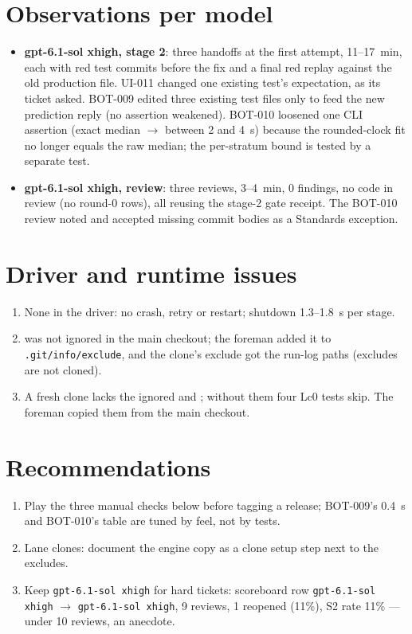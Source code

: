 \documentclass[11pt,a4paper]{article}
\begin{document}
\section*{Observations per model}

\begin{itemize}
  \item \textbf{gpt-6.1-sol xhigh, stage 2}: three handoffs at the first attempt, 11--17~min,
        each with red test commits before the fix and a final red replay against the old
        production file. UI-011 changed one existing test's expectation, as its ticket asked.
        BOT-009 edited three existing test files only to feed the new prediction reply (no
        assertion weakened). BOT-010 loosened one CLI assertion (exact median $\to$ between 2
        and 4~s) because the rounded-clock fit no longer equals the raw median; the per-stratum
        bound is tested by a separate test.
  \item \textbf{gpt-6.1-sol xhigh, review}: three reviews, 3--4~min, 0 findings, no code in
        review (no round-0 rows), all reusing the stage-2 gate receipt. The BOT-010 review noted
        and accepted missing commit bodies as a Standards exception.
\end{itemize}

\section*{Driver and runtime issues}

\begin{enumerate}
  \item None in the driver: no crash, retry or restart; shutdown 1.3--1.8~s per stage.
  \item {} was not ignored in the main checkout; the foreman added it to
        \texttt{.git/info/exclude}, and the clone's exclude got the run-log paths (excludes are
        not cloned).
  \item A fresh clone lacks the ignored  and ; without
        them four Lc0 tests skip. The foreman copied them from the main checkout.
\end{enumerate}

\section*{Recommendations}

\begin{enumerate}
  \item Play the three manual checks below before tagging a release; BOT-009's 0.4~s and
        BOT-010's table are tuned by feel, not by tests.
  \item Lane clones: document the engine copy as a clone setup step next to the excludes.
  \item Keep \texttt{gpt-6.1-sol xhigh} for hard tickets: scoreboard row
        \texttt{gpt-6.1-sol xhigh} $\rightarrow$ \texttt{gpt-6.1-sol xhigh}, 9 reviews, 1
        reopened (11\%), S2 rate 11\% --- under 10 reviews, an anecdote.
\end{enumerate}
\end{document}
